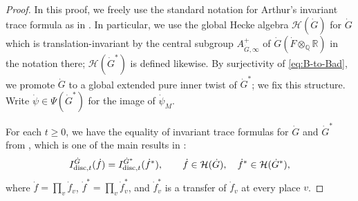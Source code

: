 \documentclass[11pt,reqno]{amsart}
\theoremstyle{plain}
\theoremstyle{definition}
\newcommand{\Q}{\mathbb{Q}}
\newcommand{\R}{\mathbb{R}}
\newcommand{\disc}{\tu{disc}}
\newcommand{\tu}{\textup}
\numberwithin{equation}{subsection}
\begin{document}
\begin{proof}
In this proof, we freely use the standard notation for Arthur's invariant trace formula as in \cite[\S3.1, \S3.3]{Arthur}. In particular, we use the global Hecke algebra $\mathcal H(\dot G)$ for $\dot G$ which is translation-invariant by the central subgroup $A_{\dot G,\infty}^+$ of $\dot G(\dot F \otimes_{\Q} \R)$ in the notation there; $\mathcal H(\dot G^*)$ is defined likewise. 
By surjectivity of \eqref{eq:B-to-Bad}, we promote $\dot G$ to a global extended pure inner twist of $\dot G^*$; we fix this structure.
Write $\dot\psi\in \Psi(\dot G^*)$ for the image of $\dot \psi_M$.

For each $t\ge 0$, we have the equality of invariant trace formulas for $\dot G$ and $\dot G^*$ from \cite[(25.28)]{Art05}, which is one of the main results in \cite{AC89}:
\[
I^{\dot G}_{\disc,t}(\dot f)=I^{\dot G^*}_{\disc,t}(\dot f^*), \qquad \dot f\in \mathcal H(\dot G),\quad \dot f^*\in \mathcal H(\dot G^*),
\]
where $\dot f=\prod_v \dot f_v$, $\dot f^*=\prod_v \dot f_v^*$, and $\dot f^*_v$ is a transfer of $\dot f_v$ at every place $v$. 


\end{proof}
\end{document}
